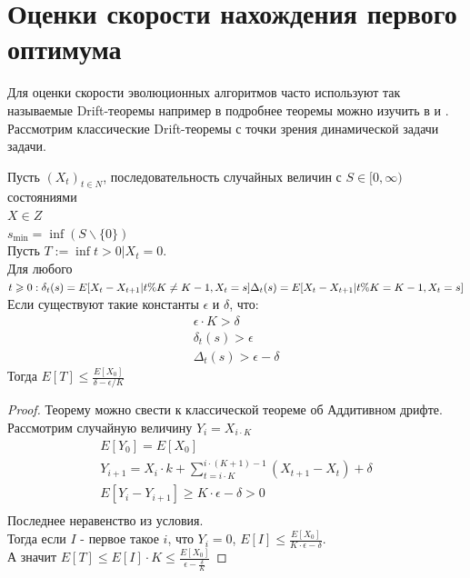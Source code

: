 \documentclass[times,specification,annotation]{itmo-student-thesis}
\begin{document}
    \section{Оценки скорости нахождения первого оптимума}
    Для оценки скорости эволюционных алгоритмов часто используют так называемые Drift-теоремы например в \cite{use_drift} подробнее теоремы можно изучить в \cite{drifts_1} и \cite{drifts_2}.
    Рассмотрим классические Drift-теоремы с точки зрения динамической задачи задачи.
    \begin{theorem}
        \label{drift:add}
        Пусть $(X_t)_{t \in N}$, последовательность случайных величин с $S \in [0, \infty)$ состояниями \\
        $X \in Z$  \\
        $s_{\min} = \inf(S \backslash \{0\})$ \\
        Пусть $T := \inf{t > 0 | X_t = 0}$. \\
        Для любого $t \geq 0 : \\
        \delta_t(s) = E[X_t - X_{t + 1}| t \% K \neq K - 1, X_t = s]\\
        \Delta_t(s) = E[X_t - X_{t + 1}| t \% K = K - 1, X_t = s]$\\
        Если существуют такие константы $\epsilon$ и $\delta$, что:\\
        \begin{gather*}
            \epsilon \cdot K > \delta \\
            \delta_t(s) > \epsilon \\
            \Delta_t(s) > \epsilon - \delta
        \end{gather*}
        Тогда $E[T] \leq \frac{E[X_0]}{\delta - \epsilon/K}$  \\
    \end{theorem}
    \begin{proof}
        Теорему можно свести к классической теореме об Аддитивном дрифте. \cite{drifts_2}
        Рассмотрим случайную величину $Y_i = X_{i \cdot K}$
        \begin{gather*}
            E[Y_0] = E[X_0] \\
            Y_{i + 1} = X_i \cdot k + \sum_{t=i \cdot K}^{i \cdot (K + 1) - 1} (X_{t + 1} - X_{t}) + \delta \\
            E[Y_i - Y_{i + 1}] \geq  K \cdot \epsilon - \delta > 0 \\
        \end{gather*}
        Последнее неравенство из условия. \\
        Тогда если $I$ - первое такое $i$, что $Y_i = 0$, $E[I] \leq \frac{E[X_0]}{K \cdot \epsilon - \delta}$. \\
        А значит $E[T] \leq E[I] \cdot K \leq \frac{E[X_0]}{\epsilon - \frac{\delta}{K}}$
    \end{proof}
\end{document}

